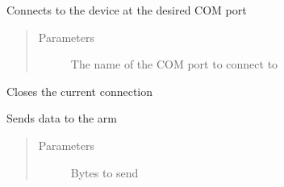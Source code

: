 \documentclass[letterpaper,10pt,english,openany,oneside]{sphinxmanual}
\begin{document}
\begin{fulllineitems}
\begin{fulllineitems}
\label{\detokenize{src/serialarmcontroller:SerialArmController.SerialArmController.connect}}
Connects to the device at the desired COM port
\begin{quote}\begin{description}
\item[{Parameters}] \leavevmode
{} \textendash{} The name of the COM port to connect to

\end{description}\end{quote}

\end{fulllineitems}


\begin{fulllineitems}
\label{\detokenize{src/serialarmcontroller:SerialArmController.SerialArmController.close}}
Closes the current connection

\end{fulllineitems}


\begin{fulllineitems}
\label{\detokenize{src/serialarmcontroller:SerialArmController.SerialArmController.send}}
Sends data to the arm
\begin{quote}\begin{description}
\item[{Parameters}] \leavevmode
{} \textendash{} Bytes to send

\end{description}\end{quote}

\end{fulllineitems}



\end{fulllineitems}
\end{document}
